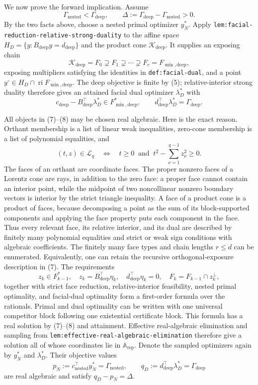 We now prove the forward implication.  Assume
\[
 \Gamma_{\mathrm{nested}}<\Gamma_{\mathrm{deep}},
 \qquad
 \Delta:=\Gamma_{\mathrm{deep}}-\Gamma_{\mathrm{nested}}>0. \tag{6}
\]
By the two facts above, choose a nested primal optimizer \(y_N^*\).  Apply
\texttt{lem:facial-reduction-relative-strong-duality} to the affine space
\(H_D=\{y:B_{\mathrm{deep}}y=d_{\mathrm{deep}}\}\) and the product cone
\(\mathcal K_{\mathrm{deep}}\).  It supplies an exposing chain
\[
 \mathcal K_{\mathrm{deep}}=F_0\supsetneq F_1\supsetneq\cdots
 \supsetneq F_r=F_{\min,\mathrm{deep}}, \tag{7}
\]
exposing multipliers satisfying the identities in
\texttt{def:facial-dual}, and a point
\(y^\circ\in H_D\cap\operatorname{ri}F_{\min,\mathrm{deep}}\).  The deep
objective is finite by (5); relative-interior strong duality therefore gives
an attained facial dual optimizer \(\lambda_D^*\) with
\[
 c_{\mathrm{deep}}-B_{\mathrm{deep}}^{\top}\lambda_D^*
 \in F_{\min,\mathrm{deep}}^*,
 \qquad
 d_{\mathrm{deep}}^{\top}\lambda_D^*
 =\Gamma_{\mathrm{deep}}. \tag{8}
\]

All objects in (7)--(8) may be chosen real algebraic.  Here is the exact
reason.  Orthant membership is a list of linear weak inequalities, zero-cone
membership is a list of polynomial equalities, and
\[
 (t,z)\in\mathcal L_q
 \quad\Longleftrightarrow\quad
 t\ge0\ \text{ and }\ t^2-\sum_{\nu=1}^{q-1}z_\nu^2\ge0. \tag{9}
\]
The faces of an orthant are coordinate faces.  The proper nonzero faces of a
Lorentz cone are rays, in addition to the zero face: a proper face cannot
contain an interior point, while the midpoint of two noncollinear nonzero
boundary vectors is interior by the strict triangle inequality.  A face of a
product cone is a product of faces, because decomposing a point as the sum of
its block-supported components and applying the face property puts each
component in the face.  Thus every relevant face, its relative interior, and
its dual are described by finitely many polynomial equalities and strict or
weak sign conditions with algebraic coefficients.  The finitely many face
types and chain lengths \(r\le d\) can be enumerated.  Equivalently, one can
retain the recursive orthogonal-exposure description in (7).  The requirements
\[
 z_k\in F_{k-1}^*,\quad
 z_k=B_{\mathrm{deep}}^{\top}\eta_k,\quad
 d_{\mathrm{deep}}^{\top}\eta_k=0,\quad
 F_k=F_{k-1}\cap z_k^\perp, \tag{10}
\]
together with strict face reduction, relative-interior feasibility, nested
primal optimality, and facial-dual optimality form a first-order formula over
the rationals.  Primal and dual optimality can be written with one universal
competitor block following one existential certificate block.  This formula
has a real solution by (7)--(8) and attainment.  Effective real-algebraic
elimination and sampling from
\texttt{lem:effective-real-algebraic-elimination} therefore give a solution
all of whose coordinates lie in \(\mathbb A_{\mathrm{rep}}\).  Denote the
sampled optimizers again by \(y_N^*\) and \(\lambda_D^*\).  Their objective
values
\[
 p_N:=c_{\mathrm{nested}}^{\top}y_N^*=\Gamma_{\mathrm{nested}},
 \qquad
 q_D:=d_{\mathrm{deep}}^{\top}\lambda_D^*=\Gamma_{\mathrm{deep}} \tag{11}
\]
are real algebraic and satisfy \(q_D-p_N=\Delta\).

